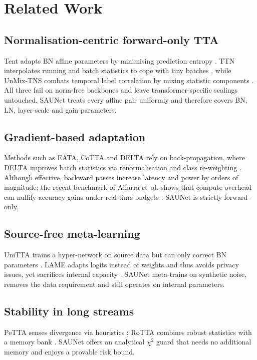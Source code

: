 \documentclass{article}
\begin{document}
\section{Related Work}
\subsection{Normalisation-centric forward-only TTA}
Tent adapts BN affine parameters by minimising prediction entropy \cite{wang-2020-tent}. TTN interpolates running and batch statistics to cope with tiny batches \cite{lim-2023-ttn}, while UnMix-TNS combats temporal label correlation by mixing statistic components \cite{tomar-2024-mixing}. All three fail on norm-free backbones and leave transformer-specific scalings untouched. SAUNet treats every affine pair uniformly and therefore covers BN, LN, layer-scale and gain parameters.

\subsection{Gradient-based adaptation}
Methods such as EATA, CoTTA and DELTA rely on back-propagation, where DELTA improves batch statistics via renormalisation and class re-weighting \cite{zhao-2023-delta}. Although effective, backward passes increase latency and power by orders of magnitude; the recent benchmark of Alfarra et~al. shows that compute overhead can nullify accuracy gains under real-time budgets \cite{alfarra-2023-evaluation}. SAUNet is strictly forward-only.

\subsection{Source-free meta-learning}
UniTTA trains a hyper-network on source data but can only correct BN parameters \cite{yoo-2023-what}. LAME adapts logits instead of weights and thus avoids privacy issues, yet sacrifices internal capacity \cite{boudiaf-2022-parameter}. SAUNet meta-trains on synthetic noise, removes the data requirement and still operates on internal parameters.

\subsection{Stability in long streams}
PeTTA senses divergence via heuristics \cite{hoang-2023-persistent}; RoTTA combines robust statistics with a memory bank \cite{yuan-2023-robust}. SAUNet offers an analytical \(\chi^2\) guard that needs no additional memory and enjoys a provable risk bound.
\end{document}
